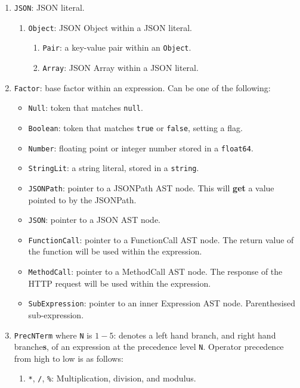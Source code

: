 \begin{enumerate}
    \item \verb|JSON|: JSON literal.
    \begin{enumerate}
        \item \verb|Object|: JSON Object within a JSON literal.
        \begin{enumerate}
            \item \verb|Pair|: a key-value pair within an \verb|Object|.
        \item \verb|Array|: JSON Array within a JSON literal.
        \end{enumerate}
    \end{enumerate}
    \item \verb|Factor|: base factor within an expression. Can be one of the following:
    \begin{itemize}
        \item \verb|Null|: token that matches \verb|null|.
        \item \verb|Boolean|: token that matches \verb|true| or \verb|false|, setting a flag.
        \item \verb|Number|: floating point or integer number stored in a \texttt{float64}.
        \item \verb|StringLit|: a string literal, stored in a \texttt{string}.
        \item \verb|JSONPath|: pointer to a JSONPath AST node. This will \textbf{get} a value pointed to by the JSONPath.
        \item \verb|JSON|: pointer to a JSON AST node.
        \item \verb|FunctionCall|: pointer to a FunctionCall AST node. The return value of the function will be used within the expression.
        \item \verb|MethodCall|: pointer to a MethodCall AST node. The response of the HTTP request will be used within the expression.
        \item \verb|SubExpression|: pointer to an inner Expression AST node. Parenthesised sub-expression.
    \end{itemize}
    \item \verb|PrecNTerm| where \verb|N| is $1-5$: denotes a left hand branch, and right hand branche\textbf{s}, of an expression at the precedence level \verb|N|. Operator precedence from high to low is as follows:
    \begin{enumerate}
        \item \verb|*|, \verb|/|, \verb|%|: Multiplication, division, and modulus.

\end{enumerate}
\end{enumerate}

